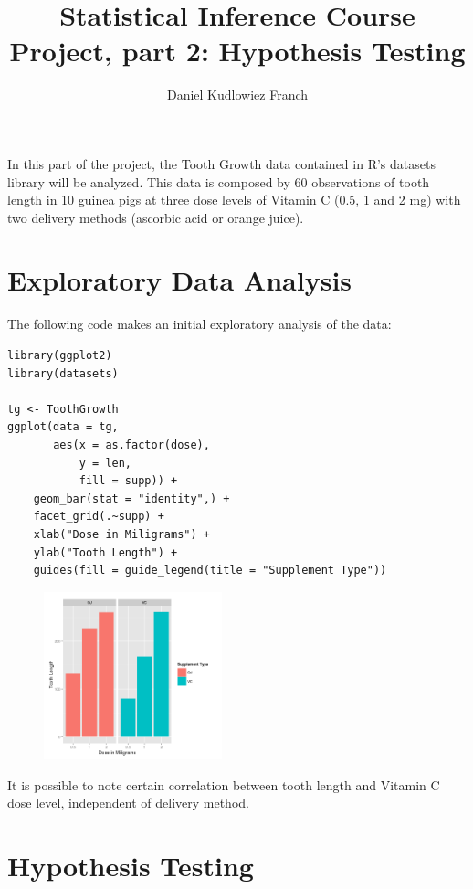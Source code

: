 \documentclass[a4paper]{article}
\title{Statistical Inference Course Project, part 2: Hypothesis Testing}
\author{Daniel Kudlowiez Franch}
\begin{document}
\maketitle

In this part of the project, the Tooth Growth data contained in R's datasets library will be analyzed. This data is composed by 60 observations of tooth length in 10 guinea pigs at three dose levels of Vitamin C (0.5, 1 and 2 mg) with two delivery methods (ascorbic acid or orange juice).

\section*{Exploratory Data Analysis}

The following code makes an initial exploratory analysis of the data:

\begin{small}
\begin{lstlisting}[frame = single]
library(ggplot2)
library(datasets)

tg <- ToothGrowth
ggplot(data = tg,
       aes(x = as.factor(dose),
           y = len,
           fill = supp)) +
    geom_bar(stat = "identity",) +
    facet_grid(.~supp) +
    xlab("Dose in Miligrams") +
    ylab("Tooth Length") +
    guides(fill = guide_legend(title = "Supplement Type"))
\end{lstlisting}
\end{small}

\begin{figure}[h!]
\centering
\includegraphics[width = 0.46\textwidth]{part2.png}
\end{figure}

It is possible to note certain correlation between tooth length and Vitamin C dose level, independent of delivery method.

\section*{Hypothesis Testing}
\end{document}
